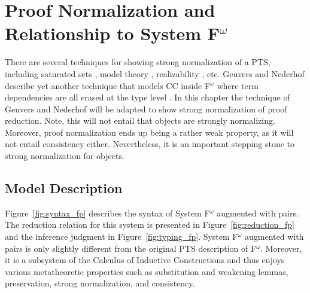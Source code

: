 \chapter{Proof Normalization and Relationship to System \texorpdfstring{F$^\omega$}{F omega}}


There are several techniques for showing strong normalization of a PTS, including saturated sets \cite{geuvers1994_sn_satset}, model theory \cite{terlouw1995_sn}, realizability \cite{ong1993}, etc.
Geuvers and Nederhof describe yet another technique that models CC inside F$^\omega$ where term dependencies are all erased at the type level \cite{geuvers1991_sn_tof}.
In this chapter the technique of Geuvers and Nederhof will be adapted to show strong normalization of proof reduction.
Note, this will not entail that objects are strongly normalizing.
Moreover, proof normalization ends up being a rather weak property, as it will not entail consistency either.
Nevertheless, it is an important stepping stone to strong normalization for objects.

\section{Model Description}

Figure~\ref{fig:syntax_fp} describes the syntax of System F$^\omega$ augmented with pairs.
The reduction relation for this system is presented in Figure~\ref{fig:reduction_fp} and the inference judgment in Figure~\ref{fig:typing_fp}.
System F$^\omega$ augmented with pairs is only slightly different from the original PTS description of F$^\omega$.
Moreover, it is a subsystem of the Calculus of Inductive Constructions and thus enjoys various metatheoretic properties such as substitution and weakening lemmas, preservation, strong normalization, and consistency.





